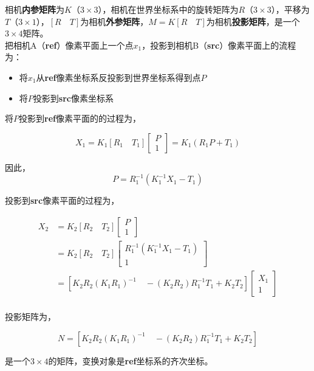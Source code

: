 \documentclass[hpyerref,UTF8,a4paper,titlepage,12pt,oneside]{ctexbook}
\theoremstyle{definition}
\begin{document}
	 相机\textbf{内参矩阵}为$K$（$3 \times 3$），相机在世界坐标系中的旋转矩阵为$R$（$3 \times 3$），平移为$T$（$3 \times 1$），$[R\quad T]$为相机\textbf{外参矩阵}，$M = K[R\quad T]$为相机\textbf{投影矩阵}，是一个$3 \times 4$矩阵。\\

	把相机A（\textbf{ref}）像素平面上一个点$x_1$，投影到相机B（\textbf{src}）像素平面上的流程为：
	\begin{itemize}
		\item 将$x_1$从\textbf{ref}像素坐标系反投影到世界坐标系得到点$P$
		\item 将$P$投影到\textbf{src}像素坐标系
	\end{itemize}

	将$P$投影到\textbf{ref}像素平面的的过程为，

	$$
		X_1 = K_1[R_1\quad T_1]
		\begin{bmatrix}
			P\\
			1
		\end{bmatrix} = K_1(R_1P + T_1)
	$$

	因此，
	$$
		P = R_1^{-1}\left(K_1^{-1}X_1 - T_1\right)
	$$

	投影到\textbf{src}像素平面的过程为，

	\begin{align}
		X_2 &= K_2[R_2 \quad T_2] 		
		\begin{bmatrix}
			P\\
			1
		\end{bmatrix} \\
		&= K_2[R_2 \quad T_2] 		
		\begin{bmatrix}
			 R_1^{-1}\left(K_1^{-1}X_1 - T_1\right)\\
			1
		\end{bmatrix}\\
		&=\left[
			K_2R_2\left(K_1R_1\right)^{-1} \quad -\left(K_2R_2\right)R_1^{-1}T_1 +K_2T_2
		\right]
		\begin{bmatrix}
			 X_1\\
			1
		\end{bmatrix}\\		
	\end{align}

	投影矩阵为，

	\begin{equation}
		N = \left[
			K_2R_2\left(K_1R_1\right)^{-1} \quad -\left(K_2R_2\right)R_1^{-1}T_1 +K_2T_2 \label{project_matrix}
		\right]	
	\end{equation}

	是一个$3 \times 4$的矩阵，变换对象是\textbf{ref}坐标系的齐次坐标。\\
\end{document}
